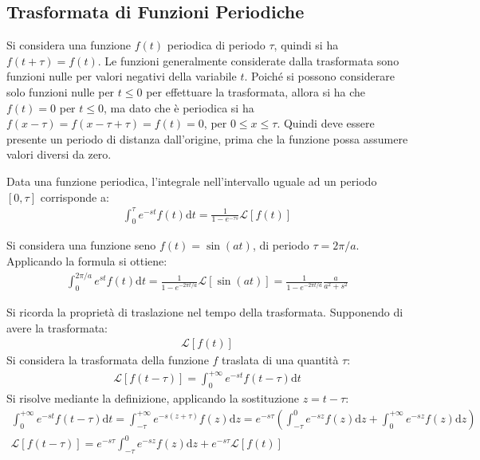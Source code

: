 \documentclass{article}
\newcommand{\df}{\mathrm{d}}
\numberwithin{equation}{subsection}
\begin{document}
\subsection{Trasformata di Funzioni Periodiche}

Si considera una funzione $f(t)$ periodica di periodo $\tau$, quindi si ha $f(t+\tau)=f(t)$. Le funzioni generalmente considerate dalla trasformata sono funzioni nulle per valori negativi della variabile $t$. 
Poiché si possono considerare solo funzioni nulle per $t\leq 0$ per effettuare la trasformata, allora si ha che $f(t)=0$ per $t\leq 0$, ma dato che è periodica si ha $f(x-\tau)=f(x-\tau+\tau)=f(t)=0$, per $0\leq x\leq\tau$. Quindi deve essere presente un periodo di distanza dall'origine, prima che la funzione possa assumere valori diversi da zero. 
 

Data una funzione periodica, l'integrale nell'intervallo uguale ad un periodo $[0,\tau]$ corrisponde a:
\begin{gather*}
    \int_0^\tau e^{-st}f(t)\df t=\frac{1}{1-e^{-\tau s}}\mathscr{L}\left[f(t)\right]
\end{gather*}

Si considera una funzione seno $f(t)=\sin(at)$, di periodo $\tau=2\pi/a$. Applicando la formula si ottiene:
\begin{gather*}
    \int_0^{2\pi/a}e^{st}f(t)\df t=\frac{1}{1-e^{-2\pi t/a}}\mathscr{L}\left[\sin(at)\right]=\frac{1}{1-e^{-2\pi t/a}}\frac{a}{a^2+s^2}
\end{gather*}


Si ricorda la proprietà di traslazione nel tempo della trasformata. 
Supponendo di avere la trasformata:
\begin{gather*}
    \mathscr{L}\left[f(t)\right]
\end{gather*}
Si considera la trasformata della funzione $f$ traslata di una quantità $\tau$:
\begin{gather*}
    \mathscr{L}\left[f(t-\tau)\right]=\int_0^{+\infty}e^{-st}f(t-\tau)\df t
\end{gather*}
Si risolve mediante la definizione, applicando la sostituzione $z=t-\tau$:
\begin{gather*}
    \int_0^{+\infty}e^{-st}f(t-\tau)\df t=
    \int_{-\tau}^{+\infty}e^{-s(z+\tau)}f(z)\df z=
    e^{-s\tau}\left(\int_{-\tau}^{0}e^{-sz}f(z)\df z+
    \int_{0}^{+\infty}e^{-sz}f(z)\df z\right)\\
    \mathscr{L}\left[f(t-\tau)\right]=e^{-s\tau}\int_{-\tau}^0e^{-sz}f(z)\df z+e^{-s\tau}\mathscr{L}\left[f(t)\right]
\end{gather*}
\end{document}

